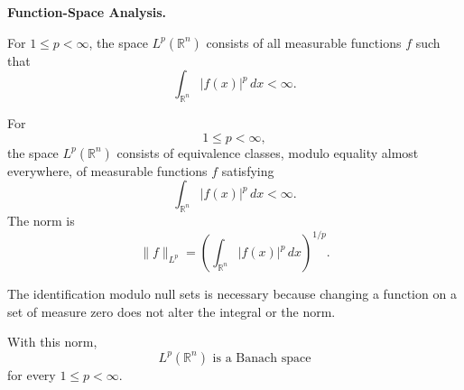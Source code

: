 \begin{problem}[CP-II-0335]
\label{prob:cp-ii-0335}
\textbf{Function-Space Analysis.}

\hspace*{1.5em}For $1\le p<\infty$, the space $L^p(\mathbb{R}^n)$ consists of all
	measurable functions $f$ such that
	\[
	\int_{\mathbb{R}^n} |f(x)|^p \, dx < \infty.
	\]
\end{problem}

\begin{solution}
For
\[
1\le p<\infty,
\]
the space \(L^p(\mathbb R^n)\) consists of equivalence classes, modulo equality almost
everywhere, of measurable functions \(f\) satisfying
\[
\int_{\mathbb R^n}|f(x)|^p\,dx<\infty.
\]
The norm is
\[
\boxed{
\|f\|_{L^p}
=
\left(
\int_{\mathbb R^n}|f(x)|^p\,dx
\right)^{1/p}.
}
\]

The identification modulo null sets is necessary because changing a function on a set of
measure zero does not alter the integral or the norm.

With this norm,
\[
\boxed{
L^p(\mathbb R^n)\text{ is a Banach space}
}
\]
for every \(1\le p<\infty\).
\end{solution}


